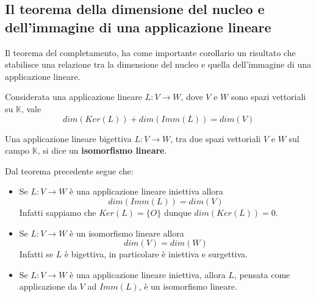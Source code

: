 
\subsection{Il teorema della dimensione del nucleo e dell'immagine di una
	applicazione lineare}
Il teorema del completamento, ha come importante corollario un risultato che stabilisce
una relazione tra la dimensione del nucleo e quella dell'immagine di una applicazione
lineare.

\begin{theorem}
	Considerata una applicazione lineare $L : V \to W$, dove $V$ e $W$ sono spazi
	vettoriali su $\mathbb{K}$, vale
	\begin{equation*}
		dim(Ker(L)) + dim(Imm(L)) = dim(V)
	\end{equation*}
\end{theorem}

\begin{defn}
	Una applicazione lineare bigettiva $L : V \to W$, tra due spazi vettoriali $V$ e $W$
	sul campo $\mathbb{K}$, si dice un \textbf{isomorfismo lineare}.
	
	Dal teorema precedente segue che:
	\begin{itemize}
		\item Se $L : V \to W$ \`e una applicazione lineare iniettiva allora
		      \[ dim(Imm(L)) = dim(V) \]
		      Infatti sappiamo che $Ker(L) = \{O\}$ dunque $dim(Ker(L)) = 0$.
		\item Se $L : V \to W$ \`e un isomorfismo lineare allora \[dim(V) = dim(W)\]
		      Infatti se $L$ \`e bigettiva, in particolare \`e iniettiva e surgettiva.
		\item Se $L : V \to W$ \`e una applicazione lineare iniettiva, allora $L$,
		      pensata come applicazione da $V$ ad $Imm(L)$, \`e un isomorfismo lineare.
	\end{itemize}
\end{defn}